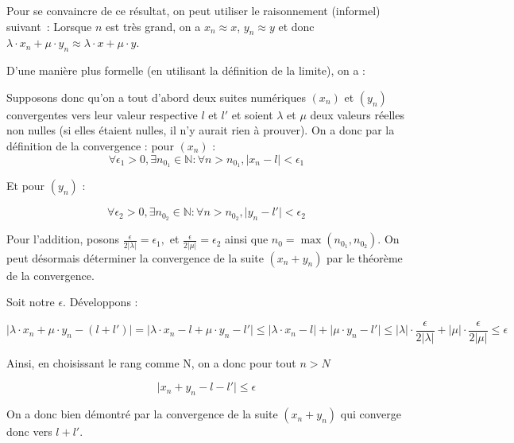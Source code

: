 Pour se convaincre de ce résultat, on peut utiliser le raisonnement (informel) suivant~: Lorsque $n$ est très grand, on a $x_n \approx x$, $y_n \approx y$ et donc $\lambda \cdot x_n + \mu \cdot y_n \approx \lambda \cdot x + \mu \cdot y$.

D'une manière plus formelle (en utilisant la définition de la limite), on a :

Supposons donc qu'on a tout d'abord deux suites numériques $(x_n)$ et $(y_n)$ convergentes vers leur valeur respective $l$ et $l'$ et soient $\lambda$ et $\mu$ deux valeurs réelles non nulles (si elles étaient nulles, il n'y aurait rien à prouver). On a donc par la définition de la convergence :
pour $(x_n)$ :
$$\forall \epsilon_1 > 0 , \exists n_{0_1} \in \mathbb{N} : \forall n > n_{0_1}, \lvert x_n - l \rvert < \epsilon_1$$

Et pour $(y_n)$ :

$$\forall \epsilon_2 > 0 , \exists n_{0_2} \in \mathbb{N} : \forall n > n_{0_2}, \lvert y_n - l' \rvert < \epsilon_2$$

Pour l'addition, posons $\frac{\epsilon }{2\lvert \lambda \rvert} =\epsilon_1,$  et $\frac{\epsilon}{2\lvert \mu \rvert} = \epsilon_2$ ainsi que $n_0 = \max({n_{0_1}, n_{0_2}})$.
On peut désormais déterminer la convergence de la suite $(x_n + y_n)$ par le théorème de la convergence.

Soit notre $\epsilon$. Développons :

$$\lvert \lambda \cdot x_n + \mu \cdot y_n - (l+l') \rvert = \lvert \lambda \cdot x_n - l + \mu \cdot y_n - l' \rvert \leq \lvert \lambda \cdot x_n - l \rvert + \lvert \mu \cdot y_n - l' \rvert \leq \lvert \lambda \rvert \cdot \frac{\epsilon }{2 \lvert \lambda \rvert} + \lvert \mu \rvert \cdot \frac{\epsilon }{2 \lvert \mu \rvert} \leq \epsilon$$

Ainsi, en choisissant le rang comme N, on a donc pour tout $n>N$

$$\lvert x_n + y_n - l - l' \rvert \leq \epsilon$$


On a donc bien démontré par la convergence de la suite $(x_n + y_n)$ qui converge donc vers $l+l'$.




